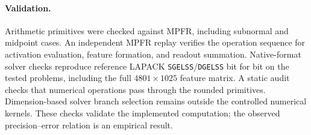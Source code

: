 \paragraph{Validation.}
Arithmetic primitives were checked against MPFR, including subnormal
and midpoint cases. An independent MPFR replay verifies the operation
sequence for activation evaluation, feature formation, and readout
summation. Native-format solver checks reproduce reference LAPACK
\texttt{SGELSS}/\texttt{DGELSS} bit for bit on the tested problems,
including the full $4801\times1025$ feature matrix.
A static audit checks that numerical operations pass through the
rounded primitives. Dimension-based solver branch selection remains
outside the controlled numerical kernels.
These checks validate the implemented computation; the observed
precision--error relation is an empirical result.
